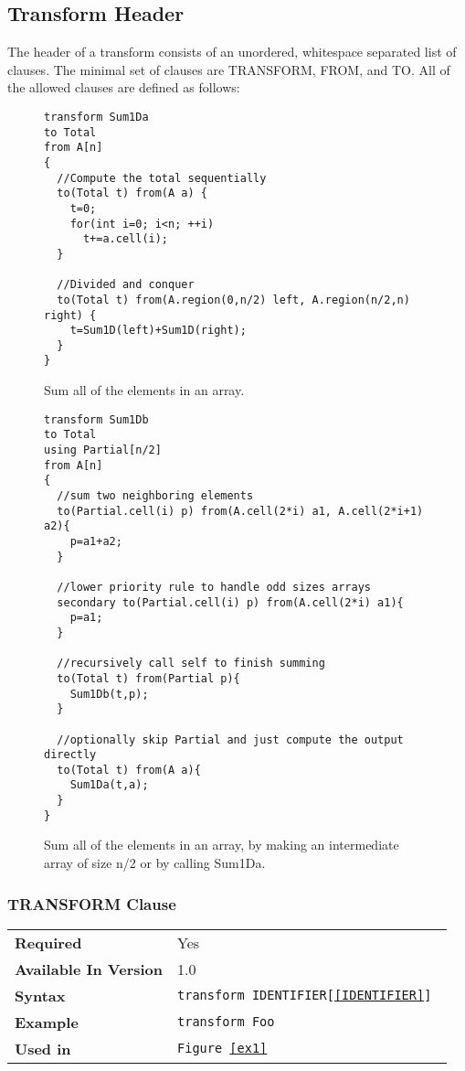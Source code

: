 \documentclass[11pt]{article}
\begin{document}
\subsection{Transform Header}
\label{sec:transform}

The header of a transform consists of an unordered, whitespace separated
list of clauses.  The minimal set of clauses are TRANSFORM, FROM, and TO.
All of the allowed clauses are defined as follows:

\begin{figure}[htb]
\begin{lstlisting}
transform Sum1Da
to Total
from A[n]
{
  //Compute the total sequentially
  to(Total t) from(A a) {
    t=0;
    for(int i=0; i<n; ++i)
      t+=a.cell(i); 
  }
  
  //Divided and conquer
  to(Total t) from(A.region(0,n/2) left, A.region(n/2,n) right) {
    t=Sum1D(left)+Sum1D(right);
  }
}
\end{lstlisting}
  \caption{
  Sum all of the elements in an array.
  \label{ex2}
  }
\end{figure}

\begin{figure}[htb]
\begin{lstlisting}
transform Sum1Db
to Total
using Partial[n/2]
from A[n]
{
  //sum two neighboring elements
  to(Partial.cell(i) p) from(A.cell(2*i) a1, A.cell(2*i+1) a2){
    p=a1+a2;
  }

  //lower priority rule to handle odd sizes arrays
  secondary to(Partial.cell(i) p) from(A.cell(2*i) a1){
    p=a1;
  }

  //recursively call self to finish summing
  to(Total t) from(Partial p){
    Sum1Db(t,p);
  }

  //optionally skip Partial and just compute the output directly
  to(Total t) from(A a){
    Sum1Da(t,a);
  }
}
\end{lstlisting}
  \caption{
  Sum all of the elements in an array, by making an intermediate array of size n/2 or by calling Sum1Da.
  \label{ex3}
  }
\end{figure}

\subsubsection{TRANSFORM Clause}

\begin{tabular}{| l | l |}
\hline
\bf Required & Yes                    \\
\bf Available In Version & 1.0        \\
\bf Syntax & \tt transform IDENTIFIER[\ref{IDENTIFIER}] \\
\bf Example & \tt transform Foo       \\
\bf Used in & \tt Figure~\ref{ex1}      \\
\hline
\end{tabular}
\end{document}
